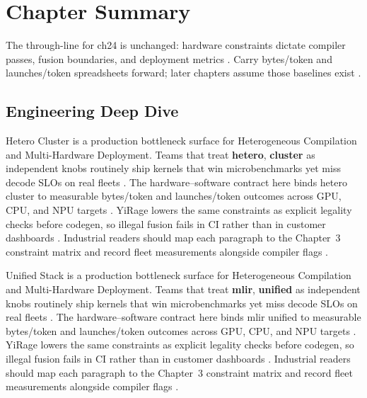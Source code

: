 \section{Chapter Summary}
\label{sec:ch24_summary}

The through-line for ch24 is unchanged: hardware constraints dictate compiler passes, fusion boundaries, and deployment metrics \citep{memoryfloor2026,amd2024xdna}. Carry bytes/token and launches/token spreadsheets forward; later chapters assume those baselines exist \citep{semianalysis2024tma,dlbook}.


\subsection{Engineering Deep Dive}
\label{sec:ch24_deep_dive}

Hetero Cluster is a production bottleneck surface for Heterogeneous Compilation and Multi-Hardware Deployment. Teams that treat \textbf{hetero}, \textbf{cluster} as independent knobs routinely ship kernels that win microbenchmarks yet miss decode SLOs on real fleets \citep{semianalysis2024tma,dlbook}. The hardware--software contract here binds hetero cluster to measurable bytes/token and launches/token outcomes across GPU, CPU, and NPU targets \citep{amd2024xdna,dao2022flashattention}. YiRage lowers the same constraints as explicit legality checks before codegen, so illegal fusion fails in CI rather than in customer dashboards \citep{amd2024aie,kwon2023vllm}. Industrial readers should map each paragraph to the Chapter~3 constraint matrix and record fleet measurements alongside compiler flags \citep{dlbook,nvidia2024cudagraphs}.

Unified Stack is a production bottleneck surface for Heterogeneous Compilation and Multi-Hardware Deployment. Teams that treat \textbf{mlir}, \textbf{unified} as independent knobs routinely ship kernels that win microbenchmarks yet miss decode SLOs on real fleets \citep{amd2024xdna,dao2022flashattention}. The hardware--software contract here binds mlir unified to measurable bytes/token and launches/token outcomes across GPU, CPU, and NPU targets \citep{amd2024aie,kwon2023vllm}. YiRage lowers the same constraints as explicit legality checks before codegen, so illegal fusion fails in CI rather than in customer dashboards \citep{dlbook,nvidia2024cudagraphs}. Industrial readers should map each paragraph to the Chapter~3 constraint matrix and record fleet measurements alongside compiler flags \citep{dao2022flashattention,liu2024deepseekv3}.

